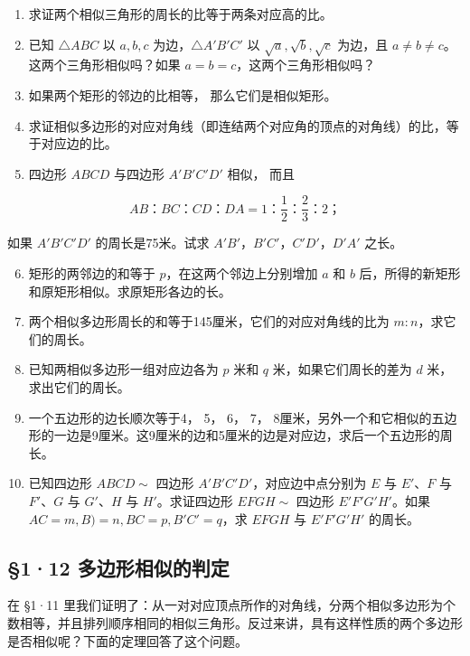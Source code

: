 \begin{enumerate}
\item
  求证两个相似三角形的周长的比等于两条对应高的比。
\item
  已知 \(\triangle ABC\) 以 \(a, b, c\) 为边，\(\triangle A'B'C'\) 以
  \(\sqrt{a}, \sqrt{b}, \sqrt{c}\) 为边，且
  \(a \neq b \neq c\)。这两个三角形相似吗？如果
  \(a = b = c\)，这两个三角形相似吗？
\item
  如果两个矩形的邻边的比相等， 那么它们是相似矩形。
\item
  求证相似多边形的对应对角线（即连结两个对应角的顶点的对角线）的比，等于对应边的比。
\item
  四边形 \(ABCD\) 与四边形 \(A'B'C'D'\) 相似， 而且
\end{enumerate}

\[
A B\text{：} B C\text{：} C D\text{：} D A = 1\text{：} \frac {1}{2}\text{：} \frac {2}{3}\text{：} 2\text{；}
\]

如果 \(A'B'C'D'\) 的周长是75米。试求
\(A'B'\)，\(B'C'\)，\(C'D'\)，\(D'A'\) 之长。

\begin{enumerate}
\setcounter{enumi}{5}
\item
  矩形的两邻边的和等于 \(p\)，在这两个邻边上分别增加 \(a\) 和 \(b\)
  后，所得的新矩形和原矩形相似。求原矩形各边的长。
\item
  两个相似多边形周长的和等于145厘米，它们的对应对角线的比为
  \(m:n\)，求它们的周长。
\item
  已知两相似多边形一组对应边各为 \(p\) 米和 \(q\) 米，如果它们周长的差为
  \(d\) 米，求出它们的周长。
\item
  一个五边形的边长顺次等于4， 5， 6， 7，
  8厘米，另外一个和它相似的五边形的一边是9厘米。这9厘米的边和5厘米的边是对应边，求后一个五边形的周长。
\item
  已知四边形 \(ABCD \sim\) 四边形 \(A'B'C'D'\)，对应边中点分别为 \(E\)
  与 \(E'\)、\(F\) 与 \(F'\)、\(G\) 与 \(G'\)、\(H\) 与
  \(H'\)。求证四边形 \(EFGH \sim\) 四边形 \(E'F'G'H'\)。如果
  \(AC = m, B) = n, BC = p, B'C' = q\)，求 \(EFGH\) 与 \(E'F'G'H'\)
  的周长。
\end{enumerate}

\subsection{§1·12
多边形相似的判定}

在 §1·11
里我们证明了：从一对对应顶点所作的对角线，分两个相似多边形为个数相等，并且排列顺序相同的相似三角形。反过来讲，具有这样性质的两个多边形是否相似呢？下面的定理回答了这个问题。

